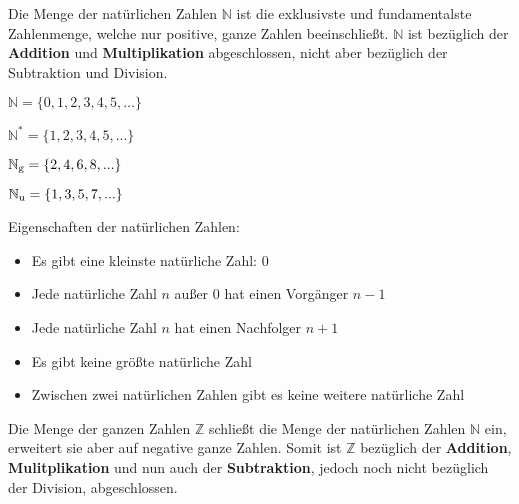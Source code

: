 



\thispagestyle{plain}



Die Menge der nat\"{u}rlichen Zahlen $\mathbb{N}$ ist die exklusivste und fundamentalste Zahlenmenge, welche nur positive, ganze Zahlen beeinschlie\ss{}t. $\mathbb{N}$ ist bez\"{u}glich der \textbf{Addition} und \textbf{Multiplikation} abgeschlossen, nicht aber bez\"{u}glich der Subtraktion und Division.

$\mathbb{N} = \{0, 1, 2, 3, 4, 5, ...\}$

$\mathbb{N^*} = \{1, 2, 3, 4, 5, ...\}$

$\mathbb{N_\textnormal{g}} = \{2, 4, 6, 8, ...\}$

$\mathbb{N_\textnormal{u}} = \{1, 3, 5, 7, ...\}$

Eigenschaften der nat\"{u}rlichen Zahlen:

\begin{itemize}
	\item Es gibt eine kleinste nat\"{u}rliche Zahl: 0
	\item Jede nat\"{u}rliche Zahl $n$ au\ss{}er 0 hat einen Vorg\"{a}nger $n - 1$
	\item Jede nat\"{u}rliche Zahl $n$ hat einen Nachfolger $n + 1$
	\item Es gibt keine gr\"{o}\ss{}te nat\"{u}rliche Zahl
	\item Zwischen zwei nat\"{u}rlichen Zahlen gibt es keine weitere nat\"{u}rliche Zahl
\end{itemize}


Die Menge der ganzen Zahlen $\mathbb{Z}$ schlie\ss{}t die Menge der nat\"{u}rlichen Zahlen $\mathbb{N}$ ein, erweitert sie aber auf negative ganze Zahlen. Somit ist $\mathbb{Z}$ bez\"{u}glich der \textbf{Addition}, \textbf{Mulitplikation} und nun auch der \textbf{Subtraktion}, jedoch noch nicht bez\"{u}glich der Division, abgeschlossen.

\begin{figure}[h!]
\end{figure}

